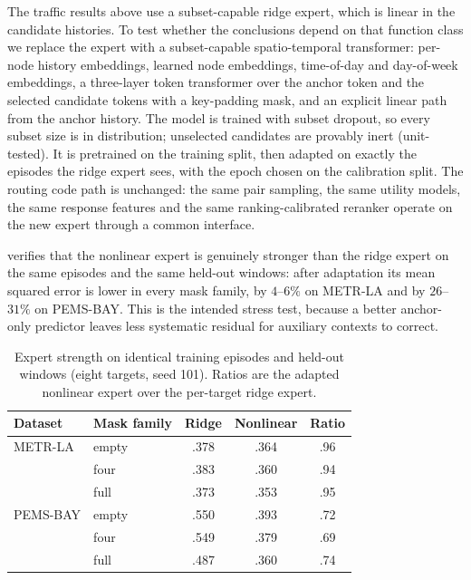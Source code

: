 The traffic results above use a subset-capable ridge expert, which is linear in
the candidate histories. To test whether the conclusions depend on that
function class we replace the expert with a subset-capable spatio-temporal
transformer: per-node history embeddings, learned node embeddings, time-of-day
and day-of-week embeddings, a three-layer token transformer over the anchor
token and the selected candidate tokens with a key-padding mask, and an
explicit linear path from the anchor history. The model is trained with subset
dropout, so every subset size is in distribution; unselected candidates are
provably inert (unit-tested). It is pretrained on the training split, then
adapted on exactly the episodes the ridge expert sees, with the epoch chosen on
the calibration split. The routing code path is unchanged: the same pair
sampling, the same utility models, the same response features and the same
ranking-calibrated reranker operate on the new expert through a common
interface.

 verifies that the nonlinear expert is genuinely
stronger than the ridge expert on the same episodes and the same held-out
windows: after adaptation its mean squared error is lower in every mask family,
by $4$--$6\%$ on METR-LA and by $26$--$31\%$ on PEMS-BAY. This is the intended
stress test, because a better anchor-only predictor leaves less systematic
residual for auxiliary contexts to correct.

\begin{table}[t]
 \centering
 \small
 \caption{Expert strength on identical training episodes and held-out windows
 (eight targets, seed 101). Ratios are the adapted nonlinear expert over the
 per-target ridge expert.}
 \label{tab:expert-strength}
 \begin{tabular}{llccc}
  \toprule
  Dataset & Mask family & Ridge & Nonlinear & Ratio\\
  \midrule
  METR-LA & empty & .378 & .364 & .96\\
          & four & .383 & .360 & .94\\
          & full & .373 & .353 & .95\\
  PEMS-BAY & empty & .550 & .393 & .72\\
           & four & .549 & .379 & .69\\
           & full & .487 & .360 & .74\\
  \bottomrule
 \end{tabular}
\end{table}

